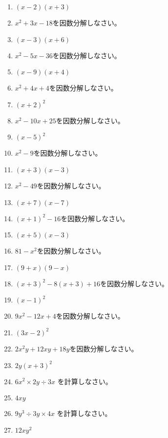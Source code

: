 \documentclass[uplatex,a4j,11pt]{jsreport}
\begin{document}
\begin{multicols}{2}
\begin{enumerate}
    \item $(x-2)(x+3)$
    \item $x^2+3x-18$を因数分解しなさい。%
    \item $(x-3)(x+6)$
    \item $x^2-5x-36$を因数分解しなさい。%
    \item $(x-9)(x+4)$
    \item $x^2+4x+4$を因数分解しなさい。%
    \item $(x+2)^2$
    \item $x^2-10x+25$を因数分解しなさい。%
    \item $(x-5)^2$
    \item $x^2-9$を因数分解しなさい。%
    \item $(x+3)(x-3)$
    \item $x^2-49$を因数分解しなさい。%
    \item $(x+7)(x-7)$
    \item $(x+1)^2-16$を因数分解しなさい。%
    \item $(x+5)(x-3)$
    \item $81-x^2$を因数分解しなさい。%
    \item $(9+x)(9-x)$
    \item $(x+3)^2-8(x+3)+16$を因数分解しなさい。%
    \item $(x-1)^2$
    \item $9x^2-12x+4$を因数分解しなさい。%
    \item $(3x-2)^2$
    \item $2x^2y+12xy+18y$を因数分解しなさい。%
    \item $2y(x+3)^2$
    \item $6x^2\times 2y\div 3x$ を計算しなさい。%
    \item $4xy$
    \item $9y^3\div3y\times4x$ を計算しなさい。%
    \item $12xy^2$



  \end{enumerate}
\newpage
\end{multicols}
\end{document}
